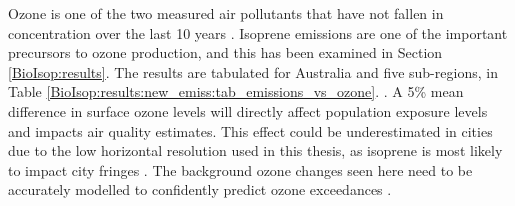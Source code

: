   Ozone is one of the two measured air pollutants that have not fallen in concentration over the last 10 years \parencite{SOE2016}.
  Isoprene emissions are one of the important precursors to ozone production, and this has been examined in Section \ref{BioIsop:results}.
  The results are tabulated for Australia and five sub-regions, in Table \ref{BioIsop:results:new_emiss:tab_emissions_vs_ozone}.
  .
  A 5\% mean difference in surface ozone levels will directly affect population exposure levels and impacts air quality estimates. 
  This effect could be underestimated in cities due to the low horizontal resolution used in this thesis, as isoprene is most likely to impact city fringes \parencite{Millet2016}.
  The background ozone changes seen here need to be accurately modelled to confidently predict ozone exceedances \parencite[e.g.,][]{Cope2004}.
  
  
  
  
  
  

